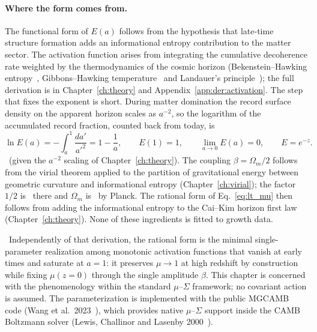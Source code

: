 \paragraph{Where the form comes from.} The functional form of $E(a)$ follows from the hypothesis that late-time structure formation adds an
informational entropy contribution to the matter sector. The activation function arises from integrating the cumulative decoherence rate weighted by
the thermodynamics of the cosmic horizon (Bekenstein--Hawking entropy~\cite{Bekenstein1973,Hawking1975}, Gibbons--Hawking
temperature~\cite{GibbonsHawking1977} and Landauer's principle~\cite{Landauer1961}); the full derivation is in Chapter~\ref{ch:theory} and
Appendix~\ref{app:der:activation}. The step that fixes the exponent is short. During matter domination the record surface density on the apparent
horizon scales as $a^{-2}$, so the logarithm of the accumulated record fraction, counted back from today, is
\begin{equation}
\ln E(a)=-\int_a^1\frac{da'}{a'^2}=1-\frac1a,\qquad E(1)=1,\qquad \lim_{a\to0}E(a)=0,\qquad E=e^{-z}.
\label{eq:lt_lnE}\end{equation}
\derived\ (given the $a^{-2}$ scaling of Chapter~\ref{ch:theory}). The coupling $\beta=\Omega_m/2$ follows from the virial theorem applied to the
partition of gravitational energy between geometric curvature and informational entropy (Chapter~\ref{ch:virial}); the factor $1/2$ is
\derived\ there and $\Omega_m$ is \measured\ by Planck. The rational form of Eq.~\eqref{eq:lt_mu} then follows from adding the informational entropy to
the Cai--Kim horizon first law~\cite{CaiKim2005} (Chapter~\ref{ch:theory}). None of these ingredients is fitted to growth data.

\interp\ Independently of that derivation, the rational form is the minimal single-parameter realization among monotonic activation functions that
vanish at early times and saturate at $a=1$: it preserves $\mu\to1$ at high redshift by construction while fixing $\mu(z{=}0)$ through the single
amplitude $\beta$. This chapter is concerned with the phenomenology within the standard $\mu$--$\Sigma$ framework; no covariant action is assumed. The
parameterization is implemented with the public MGCAMB code (Wang et al.\ 2023~\cite{Wang2023MGCAMB}), which provides native $\mu$--$\Sigma$ support
inside the CAMB Boltzmann solver (Lewis, Challinor and Lasenby 2000~\cite{Lewis2000CAMB}).

